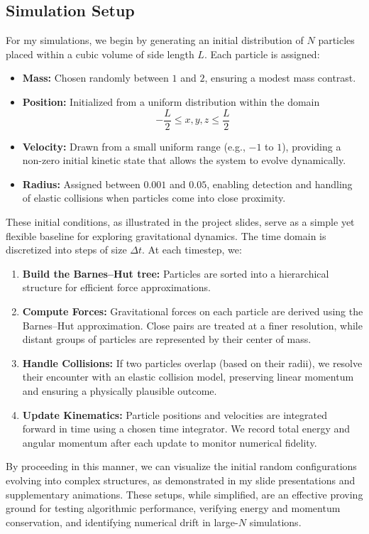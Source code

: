\documentclass[a4paper, 12pt, oneside, onecolumn]{article}
\begin{document}
\begin{multicols}{2}
\section{Simulation Setup}\label{sec:Simulation-Setup}

For my simulations, we begin by generating an initial distribution of $N$ particles placed within a cubic volume of side length $L$. Each particle is assigned:

\begin{itemize}
    \item \textbf{Mass:} Chosen randomly between $1$ and $2$, ensuring a modest mass contrast.
    \item \textbf{Position:} Initialized from a uniform distribution within the domain $$-\frac{L}{2}  \leq x, y, z \leq \frac{L}{2} $$
    \item \textbf{Velocity:} Drawn from a small uniform range (e.g., $-1$ to $1$), providing a non-zero initial kinetic state that allows the system to evolve dynamically.
    \item \textbf{Radius:} Assigned between $0.001$ and $0.05$, enabling detection and handling of elastic collisions when particles come into close proximity.
\end{itemize}

These initial conditions, as illustrated in the project slides, serve as a simple yet flexible baseline for exploring gravitational dynamics. The time domain is discretized into steps of size $\Delta t$. At each timestep, we:

\begin{enumerate}
    \item \textbf{Build the Barnes--Hut tree:} Particles are sorted into a hierarchical structure for efficient force approximations.
    \item \textbf{Compute Forces:} Gravitational forces on each particle are derived using the Barnes--Hut approximation. Close pairs are treated at a finer resolution, while distant groups of particles are represented by their center of mass.
    \item \textbf{Handle Collisions:} If two particles overlap (based on their radii), we resolve their encounter with an elastic collision model, preserving linear momentum and ensuring a physically plausible outcome.
    \item \textbf{Update Kinematics:} Particle positions and velocities are integrated forward in time using a chosen time integrator. We record total energy and angular momentum after each update to monitor numerical fidelity.
\end{enumerate}

By proceeding in this manner, we can visualize the initial random configurations evolving into complex structures, as demonstrated in my slide presentations and supplementary animations. These setups, while simplified, are an effective proving ground for testing algorithmic performance, verifying energy and momentum conservation, and identifying numerical drift in large-$N$ simulations.


\end{multicols}
\end{document}
